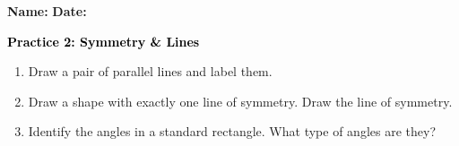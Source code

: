 \documentclass[12pt, letterpaper, fleqn]{article}
\begin{document}
\textbf{Name:} \underline{\hspace{5cm}}
\hfill
\textbf{Date:} \underline{\hspace{3cm}}\\

\begin{tcolorbox}[colback=customteal!20]
    \large\textcolor{black}{\textbf{Practice 2: Symmetry \& Lines}}
\end{tcolorbox}
\begin{enumerate}[itemsep=3.5cm, leftmargin=0.6cm]
\item Draw a pair of parallel lines and label them.
\vspace{3.5cm}
\item Draw a shape with exactly one line of symmetry. Draw the line of symmetry.
\vspace{3.5cm}
\item Identify the angles in a standard rectangle. What type of angles are they?
\end{enumerate}
\end{document}
